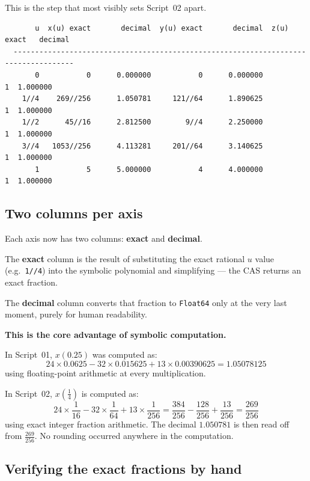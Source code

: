 \documentclass[12pt, a4paper]{article}
\newcommand{\cd}[1]{\texttt{#1}}
\begin{document}
This is the step that most visibly sets Script~02 apart.

\begin{verbatim}
       u  x(u) exact       decimal  y(u) exact       decimal  z(u) exact   decimal
  ------------------------------------------------------------------------------------
       0           0      0.000000           0      0.000000           1  1.000000
    1//4    269//256      1.050781     121//64      1.890625           1  1.000000
    1//2      45//16      2.812500        9//4      2.250000           1  1.000000
    3//4   1053//256      4.113281     201//64      3.140625           1  1.000000
       1           5      5.000000           4      4.000000           1  1.000000
\end{verbatim}

\subsection{Two columns per axis}

Each axis now has two columns: \textbf{exact} and \textbf{decimal}.

The \textbf{exact} column is the result of substituting the
exact rational $u$ value (e.g.\ \cd{1//4}) into the symbolic
polynomial and simplifying --- the CAS returns an exact fraction.

The \textbf{decimal} column converts that fraction to \cd{Float64}
only at the very last moment, purely for human readability.

\begin{diffbox}
\textbf{This is the core advantage of symbolic computation.}

In Script~01, $x(0.25)$ was computed as:
\[
  24 \times 0.0625 - 32 \times 0.015625 + 13 \times 0.00390625
  = 1.05078125
\]
using floating-point arithmetic at every multiplication.

In Script~02, $x\!\left(\tfrac{1}{4}\right)$ is computed as:
\[
  24 \times \frac{1}{16} - 32 \times \frac{1}{64}
  + 13 \times \frac{1}{256}
  = \frac{384}{256} - \frac{128}{256} + \frac{13}{256}
  = \frac{269}{256}
\]
using exact integer fraction arithmetic.
The decimal $1.050781$ is then read off from $\frac{269}{256}$.
No rounding occurred anywhere in the computation.
\end{diffbox}

\subsection{Verifying the exact fractions by hand}
\end{document}
